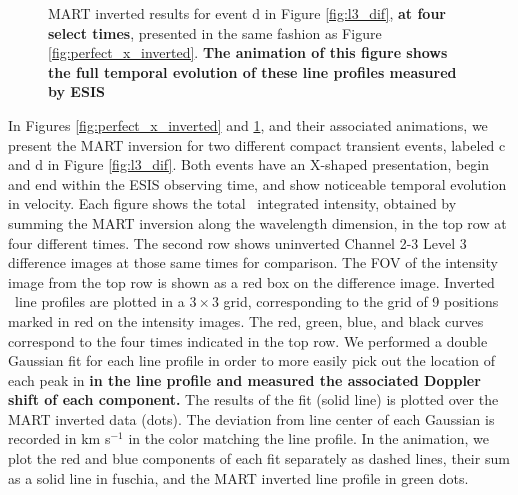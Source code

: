         
        \begin{figure}
    	\caption{MART inverted results for event d in Figure \ref{fig:l3_dif}, \textbf{at four select times}, presented in the same fashion as Figure \ref{fig:perfect_x_inverted}. 
		\textbf{The animation of this figure shows the full temporal evolution of these line profiles measured by ESIS}
    	}
    	\label{fig:other_x_inverted}
    	\end{figure}
    	
    	In Figures \ref{fig:perfect_x_inverted} and \ref{fig:other_x_inverted}, and their associated animations, we present the MART inversion for two different compact transient events, labeled c and d in Figure \ref{fig:l3_dif}.
    	Both events have an X-shaped presentation, begin and end within the ESIS observing time, and show noticeable temporal evolution in velocity.
		Each figure shows the total \ov \ integrated intensity, obtained by summing the MART inversion along the wavelength dimension, in the top row  at four different times. 
		The second row shows uninverted Channel 2-3 Level 3 difference images at those same times for comparison.
		The FOV of the intensity image from the top row is shown as a red box on the difference image.
		Inverted \ov\ line profiles are plotted in a $3\times 3$ grid, corresponding to the grid of 9 positions marked in red on the intensity images. The red, green, blue, and black curves correspond to the four times indicated in the top row.
		We performed a double Gaussian fit for each line profile in order to more easily pick out the location of each peak in \textbf{in the line profile and measured the associated Doppler shift of each component.}
		The results of the fit (solid line) is plotted over the MART inverted data (dots).
		The deviation from line center of each Gaussian is recorded in km s$^{-1}$ in the color matching the line profile.
		In the animation, we plot the red and blue components of each fit separately as dashed lines, their sum as a solid line in fuschia, and the MART inverted line profile in  green dots.
		

